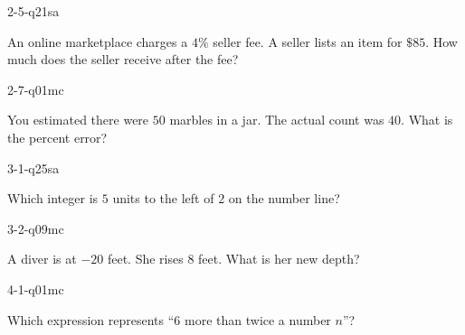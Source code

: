 \begin{practiceQuestion}{2-5-q21}{sa}
\begin{questionText}
An online marketplace charges a $4\%$ seller fee. A seller lists an item for $\$85$. How much does the seller receive after the fee?
\end{questionText}
\end{practiceQuestion}

\begin{practiceQuestion}{2-7-q01}{mc}
\begin{questionText}
You estimated there were $50$ marbles in a jar. The actual count was $40$. What is the percent error?
\end{questionText}
\end{practiceQuestion}

\begin{practiceQuestion}{3-1-q25}{sa}
\begin{questionText}
Which integer is $5$ units to the left of $2$ on the number line?
\end{questionText}
\end{practiceQuestion}

\begin{practiceQuestion}{3-2-q09}{mc}
\begin{questionText}
A diver is at $-20$ feet. She rises $8$ feet. What is her new depth?
\end{questionText}
\end{practiceQuestion}

\begin{practiceQuestion}{4-1-q01}{mc}
\begin{questionText}
Which expression represents ``$6$ more than twice a number $n$''?
\end{questionText}
\end{practiceQuestion}

